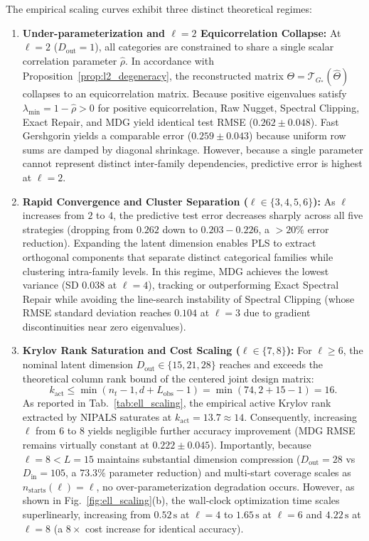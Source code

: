 \documentclass[default,sn-mathphys,Numbered]{sn-jnl}
\theoremstyle{thmstyleone}
\theoremstyle{thmstylethree}
\theoremstyle{thmstyletwo}
\newcommand{\inp}{\text{in}}
\newcommand{\outp}{\text{out}}
\begin{document}
The empirical scaling curves exhibit three distinct theoretical regimes:
\begin{enumerate}
    \item \textbf{Under-parameterization and $\ell=2$ Equicorrelation Collapse:} At $\ell = 2$ ($D_{\outp} = 1$), all categories are constrained to share a single scalar correlation parameter $\hat{\rho}$. In accordance with Proposition~\ref{prop:l2_degeneracy}, the reconstructed matrix $\Theta = \mathcal{T}_{G_*}(\hat{\Theta})$ collapses to an equicorrelation matrix. Because positive eigenvalues satisfy $\lambda_{\min} = 1 - \hat{\rho} > 0$ for positive equicorrelation, Raw Nugget, Spectral Clipping, Exact Repair, and MDG yield identical test RMSE ($0.262 \pm 0.048$). Fast Gershgorin yields a comparable error ($0.259 \pm 0.043$) because uniform row sums are damped by diagonal shrinkage. However, because a single parameter cannot represent distinct inter-family dependencies, predictive error is highest at $\ell = 2$.
    \item \textbf{Rapid Convergence and Cluster Separation ($\ell \in \{3, 4, 5, 6\}$):} As $\ell$ increases from $2$ to $4$, the predictive test error decreases sharply across all five strategies (dropping from $0.262$ down to $0.203 - 0.226$, a $>20\%$ error reduction). Expanding the latent dimension enables PLS to extract orthogonal components that separate distinct categorical families while clustering intra-family levels. In this regime, MDG achieves the lowest variance (SD $0.038$ at $\ell = 4$), tracking or outperforming Exact Spectral Repair while avoiding the line-search instability of Spectral Clipping (whose RMSE standard deviation reaches $0.104$ at $\ell = 3$ due to gradient discontinuities near zero eigenvalues).
    \item \textbf{Krylov Rank Saturation and Cost Scaling ($\ell \in \{7, 8\}$):} For $\ell \ge 6$, the nominal latent dimension $D_{\outp} \in \{15, 21, 28\}$ reaches and exceeds the theoretical column rank bound of the centered joint design matrix:
    \begin{equation}
    k_{\mathrm{act}} \le \min(n_t - 1, d + L_{\mathrm{obs}} - 1) = \min(74, 2 + 15 - 1) = 16.
    \end{equation}
    As reported in Tab.~\ref{tab:ell_scaling}, the empirical active Krylov rank extracted by NIPALS saturates at $k_{\mathrm{act}} = 13.7 \approx 14$. Consequently, increasing $\ell$ from $6$ to $8$ yields negligible further accuracy improvement (MDG RMSE remains virtually constant at $0.222 \pm 0.045$). Importantly, because $\ell = 8 < L = 15$ maintains substantial dimension compression ($D_{\outp} = 28$ vs $D_{\inp} = 105$, a $73.3\%$ parameter reduction) and multi-start coverage scales as $n_{\mathrm{starts}}(\ell) = \ell$, no over-parameterization degradation occurs. However, as shown in Fig.~\ref{fig:ell_scaling}(b), the wall-clock optimization time scales superlinearly, increasing from $0.52\,\mathrm{s}$ at $\ell = 4$ to $1.65\,\mathrm{s}$ at $\ell = 6$ and $4.22\,\mathrm{s}$ at $\ell = 8$ (a $8\times$ cost increase for identical accuracy).
\end{enumerate}
\end{document}
